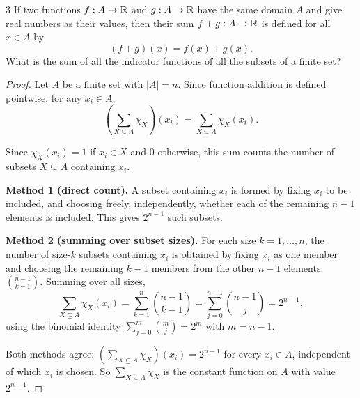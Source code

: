 \documentclass[11pt]{article}
\begin{document}
\begin{exercise}{3}
    If two functions $f:A\to\mathbb{R}$ and $g:A\to\mathbb{R}$ have the same domain
    $A$ and give real numbers as their values, then their sum
    $f+g:A\to\mathbb{R}$ is defined for all $x\in A$ by
    \[
        (f+g)(x) = f(x)+g(x).
    \]
    What is the sum of all the indicator functions of all the
    subsets of a finite set?
\end{exercise}
\begin{proof}
    Let $A$ be a finite set with $|A|=n$. Since function addition is
    defined pointwise, for any $x_i\in A$,
    \[
        \left(\sum_{X\subseteq A}\chi_X\right)(x_i)
        = \sum_{X\subseteq A}\chi_X(x_i).
    \]

    Since $\chi_X(x_i)=1$ if $x_i\in X$ and $0$ otherwise, this sum
    counts the number of subsets $X\subseteq A$ containing $x_i$.

    \textbf{Method 1 (direct count).} A subset containing $x_i$ is
    formed by fixing $x_i$ to be included, and choosing freely,
    independently, whether each of the remaining $n-1$ elements is
    included. This gives $2^{n-1}$ such subsets.

    \textbf{Method 2 (summing over subset sizes).} For each size
    $k=1,\dots,n$, the number of size-$k$ subsets containing $x_i$ is
    obtained by fixing $x_i$ as one member and choosing the
    remaining $k-1$ members from the other $n-1$ elements:
    $\binom{n-1}{k-1}$. Summing over all sizes,
    \[
        \sum_{X\subseteq A}\chi_X(x_i)
        = \sum_{k=1}^{n}\binom{n-1}{k-1}
        = \sum_{j=0}^{n-1}\binom{n-1}{j} = 2^{n-1},
    \]
    using the binomial identity $\sum_{j=0}^{m}\binom{m}{j}=2^m$
    with $m=n-1$.

    Both methods agree: $\left(\sum_{X\subseteq A}\chi_X\right)(x_i)
    = 2^{n-1}$ for every $x_i\in A$, independent of which $x_i$ is
    chosen. So $\sum_{X\subseteq A}\chi_X$ is the constant function
    on $A$ with value $2^{n-1}$.
\end{proof}
\end{document}
